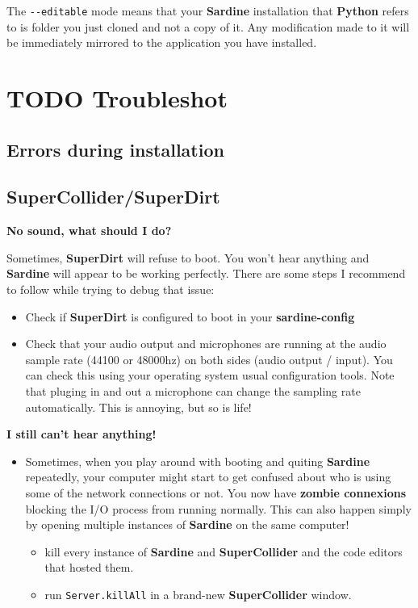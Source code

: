\documentclass[11pt]{article}
\begin{document}
The \texttt{-{}-editable} mode means that your \textbf{Sardine} installation that \textbf{Python} refers to is folder you just cloned and not a copy of it. Any modification made to it will be immediately mirrored to the application you have installed.

\section{{\bfseries\sffamily TODO} Troubleshot}
\label{sec:org3b5e97d}
\subsection{Errors during installation}
\label{sec:org90f6f60}
\subsection{SuperCollider/SuperDirt}
\label{sec:orgeda9c9c}

\textbf{No sound, what should I do?}

Sometimes, \textbf{SuperDirt} will refuse to boot. You won't hear anything and \textbf{Sardine} will appear to be working perfectly. There are some steps I recommend to follow while trying to debug that issue:
\begin{itemize}
\item Check if \textbf{SuperDirt} is configured to boot in your \textbf{sardine-config}
\item Check that your audio output and microphones are running at the audio sample rate (44100 or 48000hz) on both sides (audio output / input). You can check this using your operating system usual configuration tools. Note that pluging in and out a microphone can change the sampling rate automatically. This is annoying, but so is life!
\end{itemize}

\textbf{I still can't hear anything!}

\begin{itemize}
\item Sometimes, when you play around with booting and quiting \textbf{Sardine} repeatedly, your computer might start to get confused about who is using some of the network connections or not. You now have \textbf{zombie connexions} blocking the I/O process from running normally. This can also happen simply by opening multiple instances of \textbf{Sardine} on the same computer!
\begin{itemize}
\item kill every instance of \textbf{Sardine} and \textbf{SuperCollider} and the code editors that hosted them.
\item run \texttt{Server.killAll} in a brand-new \textbf{SuperCollider} window.
\end{itemize}
\end{itemize}
\end{document}
